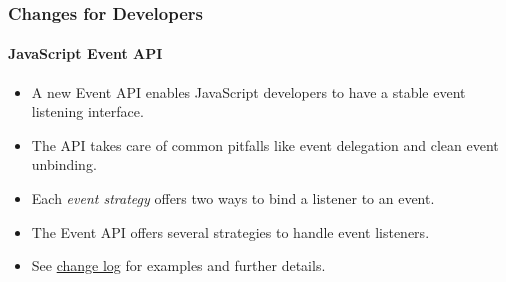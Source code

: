 
\begin{frame}[fragile]
	\frametitle{Changes for Developers}
	\framesubtitle{JavaScript Event API}

	\begin{itemize}
		\item A new Event API enables JavaScript developers to have a stable event listening interface.
		\item The API takes care of common pitfalls like event delegation and clean event unbinding.
		\item Each \textit{event strategy} offers two ways to bind a listener to an event.
		\item The Event API offers several strategies to handle event listeners.
		\item See
			\href{https://docs.typo3.org/c/typo3/cms-core/master/en-us/Changelog/10.3/Feature-90471-JavaScriptEventAPI.html}{change log}
			for examples and further details.
	\end{itemize}

\end{frame}

